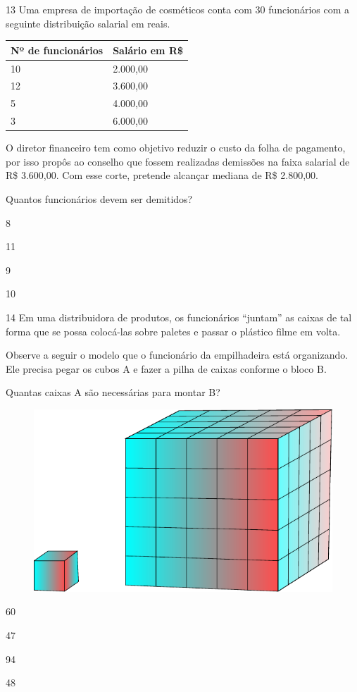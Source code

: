 \num{13} Uma empresa de importação de cosméticos conta com 30 funcionários
com a seguinte distribuição salarial em reais.

\begin{longtable}[]{@{}ll@{}}
\toprule
Nº de funcionários & Salário em R\$\tabularnewline
\midrule
\endhead
10 & 2.000,00\tabularnewline
12 & 3.600,00\tabularnewline
5 & 4.000,00\tabularnewline
3 & 6.000,00\tabularnewline
\bottomrule
\end{longtable}

O diretor financeiro tem como objetivo reduzir o custo da folha de
pagamento, por isso propôs ao conselho que fossem realizadas demissões
na faixa salarial de R\$ 3.600,00. Com esse corte, pretende alcançar
mediana de R\$ 2.800,00.

\pagebreak
Quantos funcionários devem ser demitidos?

\begin{escolha}

  \item 8

  \item 11

  \item 9

  \item 10

\end{escolha}

\num{14} Em uma distribuidora de produtos, os funcionários ``juntam'' as
caixas de tal forma que se possa colocá-las sobre paletes e passar o
plástico filme em volta.

Observe a seguir o modelo que o funcionário da empilhadeira está
organizando. Ele precisa pegar os cubos A e fazer a pilha de caixas
conforme o bloco B.

Quantas caixas A são necessárias para montar B?

\begin{figure}[htpb!]
\centering
\includegraphics[width=.5\textwidth]{./tikz/006.pdf}
\end{figure}

\begin{escolha}

  \item 60

  \item 47

  \item 94

  \item 48

\end{escolha}

